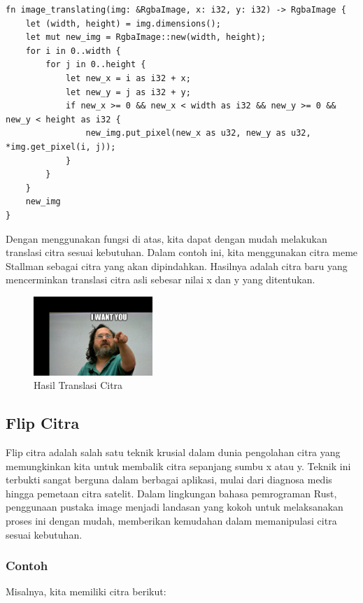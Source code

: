 \documentclass[a4paper,12pt,openany]{book}
\begin{document}
\begin{lstlisting}
fn image_translating(img: &RgbaImage, x: i32, y: i32) -> RgbaImage {
    let (width, height) = img.dimensions();
    let mut new_img = RgbaImage::new(width, height);
    for i in 0..width {
        for j in 0..height {
            let new_x = i as i32 + x;
            let new_y = j as i32 + y;
            if new_x >= 0 && new_x < width as i32 && new_y >= 0 && new_y < height as i32 {
                new_img.put_pixel(new_x as u32, new_y as u32, *img.get_pixel(i, j));
            }
        }
    }
    new_img
}
\end{lstlisting}

Dengan menggunakan fungsi di atas, kita dapat dengan mudah melakukan translasi citra sesuai kebutuhan. Dalam contoh ini, kita menggunakan citra meme Stallman sebagai citra yang akan dipindahkan. Hasilnya adalah citra baru yang mencerminkan translasi citra asli sebesar nilai x dan y yang ditentukan.

\begin{figure}[H]
    \centering
    \includegraphics[width=0.4\textwidth]{./image/geometry/stallman-meme-translated.jpg}
    \caption{Hasil Translasi Citra}
\end{figure}

\subsection{Flip Citra}

Flip citra adalah salah satu teknik krusial dalam dunia pengolahan citra yang memungkinkan kita untuk membalik citra sepanjang sumbu x atau y. Teknik ini terbukti sangat berguna dalam berbagai aplikasi, mulai dari diagnosa medis hingga pemetaan citra satelit. Dalam lingkungan bahasa pemrograman Rust, penggunaan pustaka image menjadi landasan yang kokoh untuk melaksanakan proses ini dengan mudah, memberikan kemudahan dalam memanipulasi citra sesuai kebutuhan.


\subsubsection{Contoh}
Misalnya, kita memiliki citra berikut:
\end{document}
